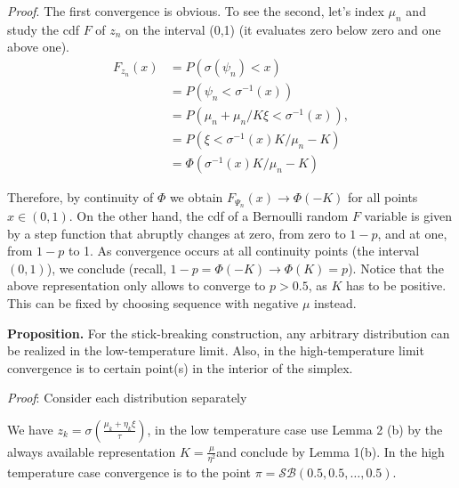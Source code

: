 \documentclass[twoside]{article}
\begin{document}
\textit{Proof}. The first convergence is obvious. To see the second, let's index $\mu_n$ and  study the cdf $F$ of $z_n$ on the interval (0,1) (it evaluates zero below zero and one above one).
\begin{align}F_{z_n}(x)&= P(\sigma(\psi_n)<x) \\
&=P(\psi_n< \sigma^{-1}(x))\\
&=P(\mu_n +\mu_n/K\xi <\sigma^{-1}(x)),\\\
&= P( \xi <\sigma^{-1}(x)K/\mu_n - K)\\
&= \Phi( \sigma^{-1}(x)K/\mu_n - K) 
\end{align}

Therefore, by continuity of $\Phi$ we obtain $F_{\Psi_n}(x)\rightarrow \Phi(-K)$ for all points $x\in(0,1)$. On the other hand, the cdf of a Bernoulli random $F$ variable is given by  a step function that abruptly changes at zero, from zero to $1-p$, and at one, from $1-p$ to 1. As convergence occurs at all continuity points (the interval $(0,1)$), we conclude (recall, $1-p= \Phi(-K)\rightarrow \Phi(K)=p$). Notice that the above representation only allows  to converge to $p>0.5$, as $K$ has to be positive. This can be fixed by choosing sequence with negative $\mu$ instead.

\textbf{Proposition.} For the stick-breaking construction, any arbitrary distribution can be realized in the low-temperature limit. Also, in the high-temperature limit convergence is to certain point(s) in the interior of the simplex.

\textit{Proof}: Consider each distribution separately

We have $z_k = \sigma\left( \frac{\mu_k+\eta_k\xi}{\tau}\right)$, in the low temperature case use Lemma 2 (b) by the always available representation  $K= \frac{\mu}{\eta^2}$and conclude by Lemma 1(b). In the high temperature case convergence is to the point $\pi = \mathcal{SB}(0.5,0.5,\ldots, 0.5)$.


\end{document}

